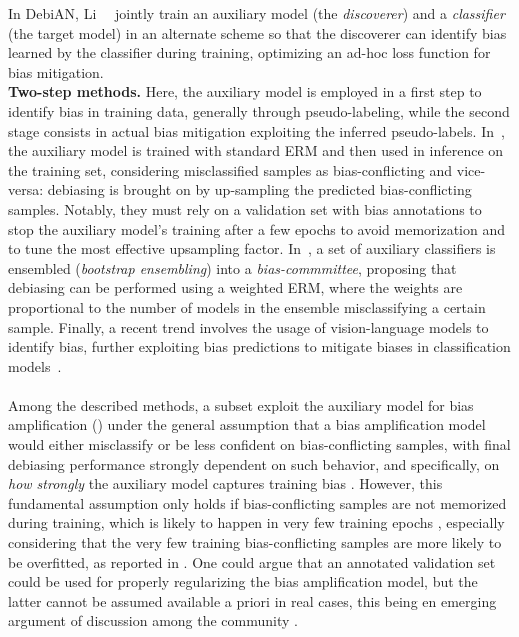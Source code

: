 In DebiAN, Li~\etal~\cite{li2022discover} jointly train an auxiliary model (the \textit{discoverer})  and a \textit{classifier} (the target model) in an alternate scheme so that the discoverer can identify bias learned by the classifier during training, optimizing an ad-hoc loss function for bias mitigation. 
\vspace{2mm}
\\ \textbf{Two-step methods.} Here, the auxiliary model is employed in a first step to identify bias in training data, generally through pseudo-labeling, while the second stage consists in actual bias mitigation exploiting the inferred pseudo-labels. In~\cite {pmlr-v139-liu21f_JTT}, the auxiliary model is trained with standard ERM and then used in inference on the training set, considering misclassified samples as bias-conflicting and vice-versa: debiasing is brought on by up-sampling the predicted bias-conflicting samples. Notably, they must rely on a validation set with bias annotations to stop the auxiliary model's training after a few epochs to avoid memorization and to tune the most effective upsampling factor.  In~\cite{NEURIPS2022_75004615_LWBC}, a set of auxiliary classifiers is ensembled (\textit{bootstrap ensembling}) into a \textit{bias-commmittee}, proposing that debiasing can be performed using a weighted ERM, where the weights are proportional to the number of models in the ensemble misclassifying a certain sample. Finally, a recent trend involves the usage of vision-language models to identify bias, further exploiting bias predictions to mitigate biases in classification models~\cite{eyuboglu2022domino, kim2024discovering, zhang2023diagnosing}.\\
\\Among the described methods, a subset exploit the auxiliary model for bias amplification (\cite{Lee_Park_Kim_Lee_Choi_Choo_2023, nam2020learning, sohoni2020no}) under the general assumption that a bias amplification model would either misclassify or be less confident on bias-conflicting samples, with final debiasing performance strongly dependent on such behavior, and specifically, on \textit{how strongly} the auxiliary model captures training bias \cite{pastore2024lookingmodeldebiasinglens, Lee_Park_Kim_Lee_Choi_Choo_2023}.
However, this fundamental assumption only holds if bias-conflicting samples are not memorized during training, which is likely to happen in very few training epochs \cite{zarlenga2024efficient, pastore2024lookingmodeldebiasinglens}, especially considering that the very few training bias-conflicting samples are more likely to be overfitted, as reported in \cite{Sagawa*2020Distributionally, cao2019learning}. One could argue that an annotated validation set could be used for properly regularizing the bias amplification model, but the latter cannot be assumed available a priori in real cases, this being en emerging argument of discussion among the community \cite{zarlenga2024efficient, pastore2024lookingmodeldebiasinglens}. 
